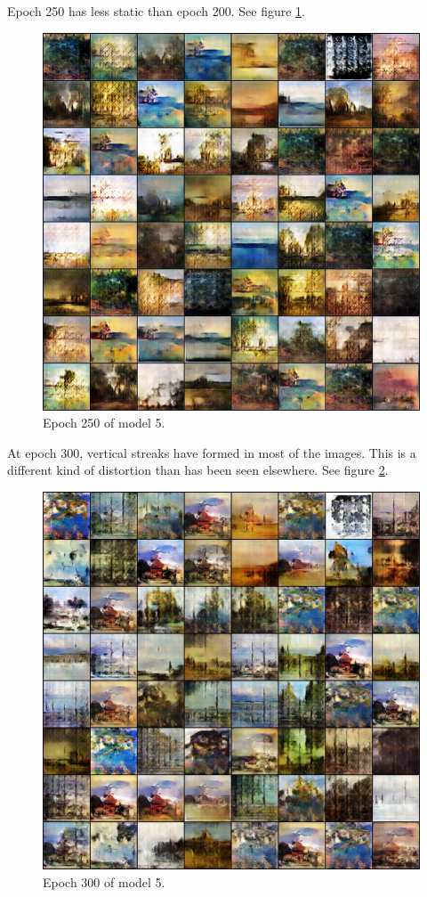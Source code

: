 \documentclass[11pt,letterpaper]{article}
\begin{document}
				Epoch 250 has less static than epoch 200.
				See figure \ref{fig:wa128:epoch250generator}.
				\begin{figure}
					\centering
					\includegraphics[width=1.0\linewidth]{results/model5/epoch250_generator}
					\caption{Epoch 250 of model 5.}
					\label{fig:wa128:epoch250generator}
				\end{figure}

				At epoch 300, vertical streaks have formed in most of the images.
				This is a different kind of distortion than has been seen elsewhere.
				See figure \ref{fig:wa128:epoch300generator}.
				\begin{figure}
					\centering
					\includegraphics[width=1.0\linewidth]{results/model5/epoch300_generator}
					\caption{Epoch 300 of model 5.}
					\label{fig:wa128:epoch300generator}
				\end{figure}
\end{document}
